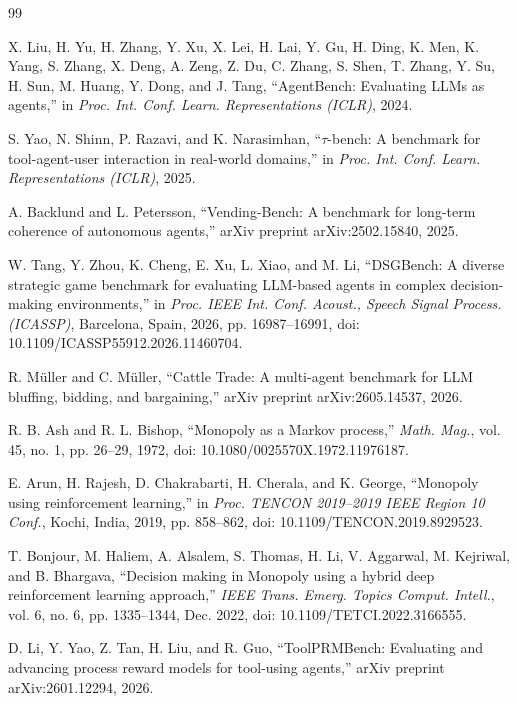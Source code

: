 \documentclass[conference]{IEEEtran}
\begin{document}
\begin{thebibliography}{99}

X. Liu, H. Yu, H. Zhang, Y. Xu, X. Lei, H. Lai, Y. Gu, H. Ding, K. Men,
K. Yang, S. Zhang, X. Deng, A. Zeng, Z. Du, C. Zhang, S. Shen, T. Zhang,
Y. Su, H. Sun, M. Huang, Y. Dong, and J. Tang, ``AgentBench: Evaluating LLMs
as agents,'' in \emph{Proc. Int. Conf. Learn. Representations (ICLR)}, 2024.

S. Yao, N. Shinn, P. Razavi, and K. Narasimhan, ``$\tau$-bench: A benchmark
for tool-agent-user interaction in real-world domains,'' in \emph{Proc. Int.
Conf. Learn. Representations (ICLR)}, 2025.

A. Backlund and L. Petersson, ``Vending-Bench: A benchmark for long-term
coherence of autonomous agents,'' arXiv preprint arXiv:2502.15840, 2025.

W. Tang, Y. Zhou, K. Cheng, E. Xu, L. Xiao, and M. Li, ``DSGBench: A diverse
strategic game benchmark for evaluating LLM-based agents in complex
decision-making environments,'' in \emph{Proc. IEEE Int. Conf. Acoust.,
Speech Signal Process. (ICASSP)}, Barcelona, Spain, 2026,
pp. 16987--16991, doi: 10.1109/ICASSP55912.2026.11460704.

R. M\"uller and C. M\"uller, ``Cattle Trade: A multi-agent benchmark for LLM
bluffing, bidding, and bargaining,'' arXiv preprint arXiv:2605.14537, 2026.

R. B. Ash and R. L. Bishop, ``Monopoly as a Markov process,''
\emph{Math. Mag.}, vol. 45, no. 1, pp. 26--29, 1972,
doi: 10.1080/0025570X.1972.11976187.

E. Arun, H. Rajesh, D. Chakrabarti, H. Cherala, and K. George, ``Monopoly
using reinforcement learning,'' in \emph{Proc. TENCON 2019--2019 IEEE Region
10 Conf.}, Kochi, India, 2019, pp. 858--862,
doi: 10.1109/TENCON.2019.8929523.

T. Bonjour, M. Haliem, A. Alsalem, S. Thomas, H. Li, V. Aggarwal,
M. Kejriwal, and B. Bhargava, ``Decision making in Monopoly using a hybrid
deep reinforcement learning approach,'' \emph{IEEE Trans. Emerg. Topics
Comput. Intell.}, vol. 6, no. 6, pp. 1335--1344, Dec. 2022,
doi: 10.1109/TETCI.2022.3166555.

D. Li, Y. Yao, Z. Tan, H. Liu, and R. Guo, ``ToolPRMBench: Evaluating and
advancing process reward models for tool-using agents,'' arXiv preprint
arXiv:2601.12294, 2026.


\end{thebibliography}
\end{document}
